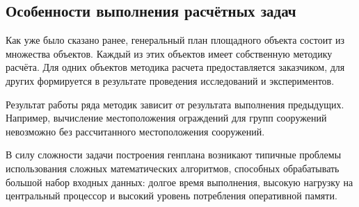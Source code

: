 \subsection{\Large{Особенности выполнения расчётных задач}}

Как уже было сказано ранее, генеральный план площадного объекта состоит из множества объектов.
Каждый из этих объектов имеет собственную методику расчёта.
Для одних объектов методика расчета предоставляется заказчиком,
для других формируется в результате проведения исследований и экспериментов.

Результат работы ряда методик зависит от результата выполнения предыдущих.
Например, вычисление местоположения ограждений для групп сооружений невозможно без рассчитанного
местоположения сооружений.

В силу сложности задачи построения генплана
возникают типичные проблемы использования сложных математических алгоритмов,
способных обрабатывать большой набор входных данных: долгое время выполнения,
высокую нагрузку на центральный процессор и высокий уровень потребления оперативной памяти.
